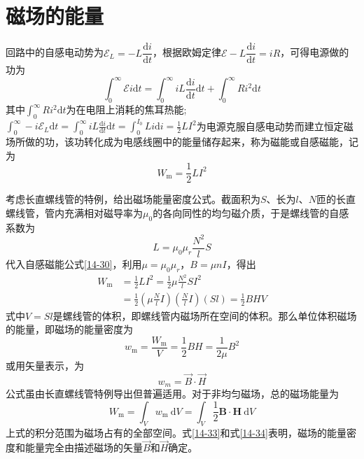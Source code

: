 \documentclass[
	12pt, %
	a4paper, %
]{myLegrandOrangeBook}
\newcommand{\rmd}{\mathrm{d}}
\newcommand{\deriv}[2]{\frac{\rmd #1}{\rmd #2}}
\newcommand{\dderiv}[2]{\dfrac{\rmd #1}{\rmd #2}}
\begin{document}
\section{磁场的能量}

回路中的自感电动势为\(\mathscr{E}_L = -L\dderiv{i}{t}\)，根据欧姆定律\(\mathscr{E} - L \dderiv{i}{t} = i R\)，可得电源做的功为
\begin{equation}
    \int_{0}^{\infty} \mathscr{E} i \rmd t = \int_{0}^{\infty} i L\deriv{i}{t} \rmd t + \int_{0}^{\infty} R i^2 \rmd t
\end{equation}
其中$\int_0^{\infty} R i^2 \rmd t$为在电阻上消耗的焦耳热能; $\int_0^{\infty}-i \mathscr{E}_L \rmd t=\int_0^{\infty} i L \deriv{i}{t} \rmd t=\int_0^{I_0} L i \rmd i=\frac{1}{2} L I^2$为电源克服自感电动势而建立恒定磁场所做的功，该功转化成为电感线圈中的能量储存起来，称为磁能或自感磁能，记为
\begin{equation}
W_{\mathrm{m}}=\frac{1}{2} L I^2
\label{14-30}
\end{equation}

考虑长直螺线管的特例，给出磁场能量密度公式。截面积为\(S\)、长为\(l\)、\(N\)匝的长直螺线管，管内充满相对磁导率为\(\mu_0\)的各向同性的均匀磁介质，于是螺线管的自感系数为
$$
L=\mu_0 \mu_r \frac{N^2}{l} S
$$
代入自感磁能公式\ref{14-30}，利用\(\mu = \mu_0 \mu_r\)，\(B = \mu n I\)，得出
\begin{equation}
\begin{aligned}
W_{\mathrm{m}} & =\frac{1}{2} L I^2=\frac{1}{2} \mu \frac{N^2}{l} S I^2 \\
& =\frac{1}{2}\left(\mu \frac{N}{l} I\right)\left(\frac{N}{l} I\right)(S l)=\frac{1}{2} B H V
\end{aligned}
\end{equation}
式中\(V=Sl\)是螺线管的体积，即螺线管内磁场所在空间的体积。那么单位体积磁场的能量，即磁场的能量密度为
\begin{equation}
w_{\mathrm{m}}=\frac{W_{\mathrm{m}}}{V}=\frac{1}{2} B H=\frac{1}{2 \mu} B^2
\label{14-32}
\end{equation}
或用矢量表示，为
\begin{equation}
    w_m = \overrightarrow{B} \cdot \overrightarrow{H}
    \label{14-33}
\end{equation}
公式虽由长直螺线管特例导出但普遍适用。对于非均匀磁场，总的磁场能量为
\begin{equation}
W_{\mathrm{m}}=\int_V w_{\mathrm{m}} \mathrm{~d} V=\int_V \frac{1}{2} \boldsymbol{B} \cdot \boldsymbol{H} \mathrm{~d} V
\label{14-34}
\end{equation}
上式的积分范围为磁场占有的全部空间。式\ref{14-33}和式\ref{14-34}表明，磁场的能量密度和能量完全由描述磁场的矢量\(\overrightarrow{B}\)和\(\overrightarrow{H}\)确定。
\end{document}
